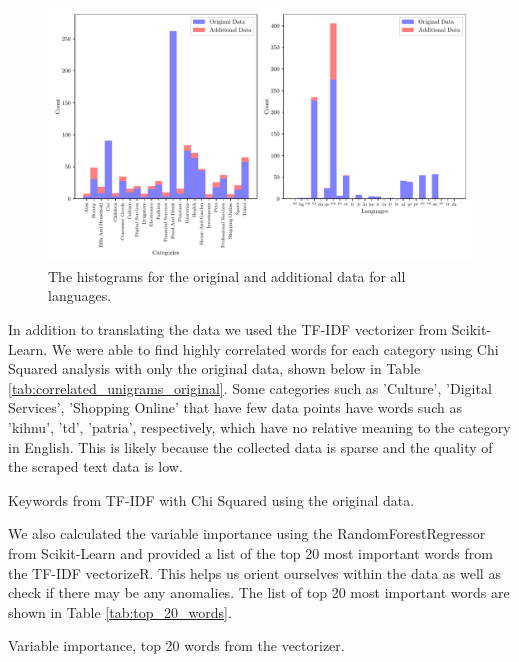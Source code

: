 \begin{figure}[!ht]
  \centering
  \includegraphics[width=\textwidth]{../img/plot_all_hist.pdf}
  \caption{The histograms for the original and additional data for all languages.}
  \label{fig:all_hist}
\end{figure}


In addition to translating the data we used the TF-IDF vectorizer from Scikit-Learn. We were able to find highly correlated words for each category using Chi Squared analysis with only the original data, shown below in Table \ref{tab:correlated_unigrams_original}. Some categories such as 'Culture', 'Digital Services', 'Shopping Online' that have few data points have words such as 'kihnu', 'td', 'patria', respectively, which have no relative meaning to the category in English. This is likely because the collected data is sparse and the quality of the scraped text data is low.


\begin{table}[!ht]
\centering
\caption{Keywords from TF-IDF with Chi Squared using the original data.}

\label{tab:correlated_unigrams_original}
\end{table}


We also calculated the variable importance using the RandomForestRegressor from Scikit-Learn and provided a list of the top 20 most important words from the TF-IDF vectorizeR. This helps us orient ourselves within the data as well as check if there may be any anomalies. The list of top 20 most important words are shown in Table \ref{tab:top_20_words}.


\begin{table}[!ht]
\centering
\caption{Variable importance, top 20 words from the vectorizer.}

\label{tab:top_20_words}
\end{table}



